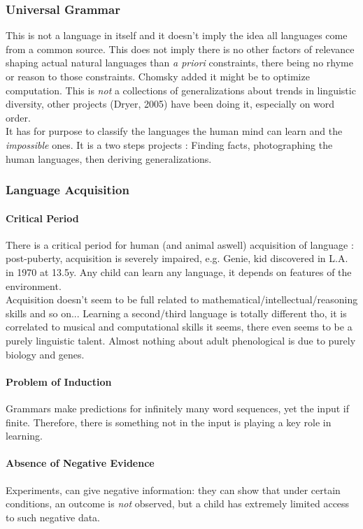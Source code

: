 \documentclass{cours}
\begin{document}
\subsubsection{Universal Grammar}
This is not a language in itself and it doesn't imply the idea all languages come from a common source. This does not imply there is no other factors of relevance shaping actual natural languages than \textsl{a priori} constraints, there being no rhyme or reason to those constraints. Chomsky added it might be to optimize computation. This is \emph{not} a collections of generalizations about trends in linguistic diversity, other projects (Dryer, 2005) have been doing it, especially on word order. \\
It has for purpose to classify the languages the human mind can learn and the \textit{impossible} ones. It is a two steps projects\! : Finding facts, photographing the human languages, then deriving generalizations.

\subsubsection{Language Acquisition}
\paragraph{Critical Period}
There is a critical period for human (and animal aswell) acquisition of language\! : post-puberty, acquisition is severely impaired, e.g. Genie, kid discovered in L.A. in 1970 at 13.5y. Any child can learn any language, it depends on features of the environment.\\
Acquisition doesn't seem to be full related to mathematical/intellectual/reasoning skills and so on... Learning a second/third language is totally different tho, it is correlated to musical and computational skills it seems, there even seems to be a purely linguistic talent. Almost nothing about adult phenological is due to purely biology and genes.

\paragraph{Problem of Induction}
Grammars make predictions for infinitely many word sequences, yet the input if finite. Therefore, there is something not in the input is playing a key role in learning.

\paragraph{Absence of Negative Evidence}
Experiments, can give negative information\!: they can show that under certain conditions, an outcome is \emph{not} observed, but a child has extremely limited access to such negative data.
\end{document}
